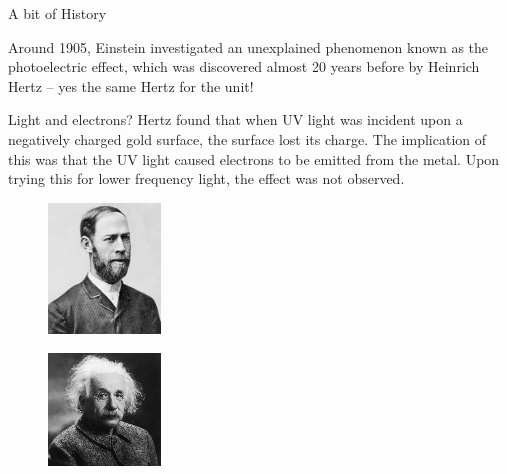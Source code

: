 \documentclass[../Main.tex]{subfiles}
\begin{document}
\begin{frame}{A bit of History}
\begin{multicols}{2}
Around 1905, Einstein investigated an unexplained phenomenon known as the photoelectric effect, which was discovered almost 20 years before by Heinrich Hertz -- yes the same Hertz for the unit!
\pause
\begin{minipage}{6cm}
\begin{block}{Light and electrons?}
Hertz found that when UV light was incident upon a negatively charged gold surface, the surface lost its charge. The implication of this was that the UV light caused electrons to be emitted from the metal. Upon trying this for lower frequency light, the effect was not observed.
\end{block}
\end{minipage}
\columnbreak
    \begin{figure}
        \centering
        \includegraphics[width=3cm]{Quantum_Images/Heinrich_Rudolf_Hertz.jpg}
    \end{figure}
    \begin{figure}
        \centering
        \includegraphics[width=3cm]{Quantum_Images/einstein.jpeg}
    \end{figure}
    \end{multicols}
\end{frame}
\end{document}
